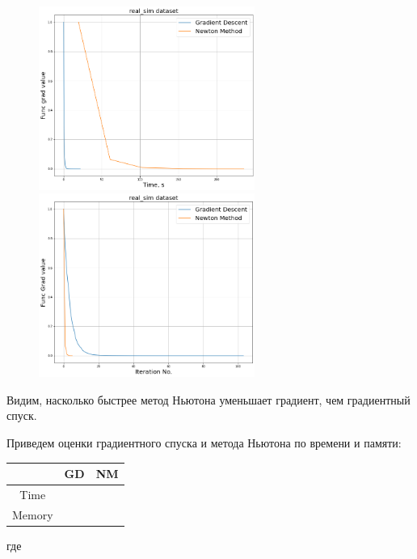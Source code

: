 \documentclass[14pt]{article}
\begin{document}
 \begin{figure}[h]
	\centering
	\includegraphics[height=6cm]{real_grad.png}
	\includegraphics[height=6cm]{real_grad_no.png}
\end{figure}

Видим, насколько быстрее метод Ньютона уменьшает градиент, чем градиентный спуск.

\newpage

Приведем оценки градиентного спуска и метода Ньютона по времени и памяти:

\begin{center}
\begin{tabular}{ | c || c c |}
	\hline 
		& GD & NM \\ [0.5ex]
	\hline \hline
	Time & & \\
	Memory & & \\ \hline
\end{tabular}
\end{center}

где $$
\end{document}
